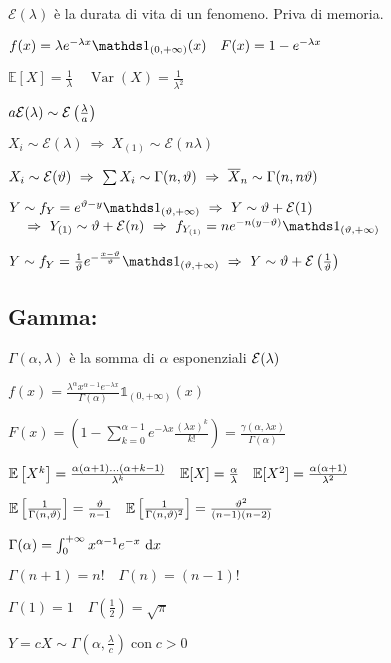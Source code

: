 $\mathcal{E}(\lambda)$ è la durata di vita di un fenomeno. Priva di memoria.

$f(x)=\lambda e^{-\lambda x} \Ind_{(0,+\infty)}(x) \quad F(x)=1-e^{-\lambda x}$

$\mathbb{E}[X]=\frac{1}{\lambda}\quad \operatorname{Var}(X)=\frac{1}{\lambda^{2}}$

$a\mathcal{E}(\lambda)\sim\mathcal{E}\left(\frac{\lambda}{a}\right)$

$X_{i} \sim \mathcal{E}(\lambda)\ \Rightarrow\ X_{(1)} \sim \mathcal{E}(n \lambda)$

$X_i\sim\Ec(\theta)\ \Rightarrow\ \sum X_i\sim\Gamma(n,\theta)\ \Rightarrow\ \Xn\sim\Gamma(n,n\theta)$

$Y\sim f_Y=e^{\theta-y}\Ind_{(\theta,+\infty)}\ \Rightarrow\ Y\sim\theta+\Ec(1)$ \\
$\text{}\quad\Rightarrow\ Y_{(1)}\sim\theta+\Ec(n)\ \Rightarrow\ f_{Y_{(1)}}=ne^{-n(y-\theta)}\Ind_{(\theta,+\infty)}$

$Y\sim f_Y=\frac{1}{\theta}e^{-\frac{x-\theta}{\theta}}\Ind_{(\theta,+\infty)}\ \Rightarrow\ Y\sim\theta+\Ec\left(\frac{1}{\theta}\right)$

\subsection{Gamma:} 

$\Gamma(\alpha, \lambda)$ è la somma di $\alpha$ esponenziali $\mathcal{E}(\lambda)$

$f(x)=\frac{\lambda^{\alpha} x^{\alpha-1} e^{-\lambda x}}{\Gamma(\alpha)} \mathbb{1}_{(0,+\infty)}(x)$

$F(x)=\left(1-\sum_{k=0}^{\alpha-1} e^{-\lambda x} \frac{(\lambda x)^{k}}{k !}\right)=\frac{\gamma(\alpha, \lambda x)}{\Gamma(\alpha)}$

$\mathbb{E}\left[X^{k}\right]=\frac{\alpha(\alpha+1) \ldots(\alpha+k-1)}{\lambda^{k}} \quad \mathbb{E}[X]=\frac{\alpha}{\lambda}\quad\mathbb{E}[X^2]=\frac{\alpha(\alpha+1)}{\lambda^2}$

$\mathbb{E}\left[\frac{1}{\Gamma(n,\vartheta)}\right]=\frac{\vartheta}{n-1}\quad \mathbb{E}\left[\frac{1}{\Gamma(n,\vartheta)^2}\right]=\frac{\vartheta^2}{(n-1)(n-2)}$

$\Gamma(\alpha)=\int_{0}^{+\infty} x^{\alpha-1} e^{-x} \  \mathrm{d} x$

$\Gamma(n+1)=n!\quad \Gamma(n)=(n-1)!$

$\Gamma(1)=1\quad \Gamma\left(\frac{1}{2}\right)=\sqrt{\pi}$

$Y=c X \sim \Gamma\left(\alpha, \frac{\lambda}{c}\right) \operatorname{con} c>0$

